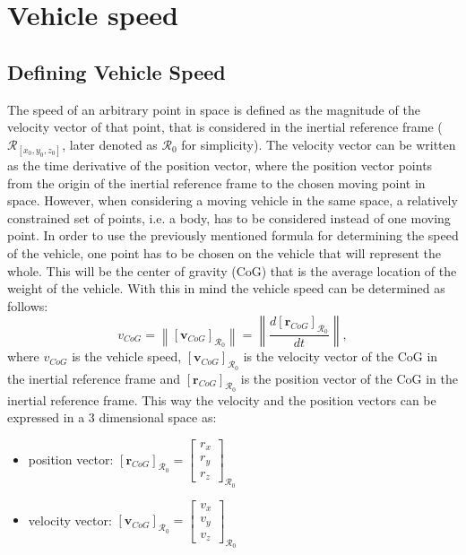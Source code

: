 \chapter{Vehicle speed}

\section{Defining Vehicle Speed}

The speed of an arbitrary point in space is defined as the magnitude of the velocity vector of that point, that is considered in the inertial reference frame ($\mathcal{R}_{[x_0, y_0, z_0]}$, later denoted as $\mathcal{R}_0$ for simplicity). The velocity vector can be written as the time derivative of the position vector, where the position vector points from the origin of the inertial reference frame to the chosen moving point in space. However, when considering a moving vehicle in the same space, a relatively constrained set of points, i.e. a body, has to be considered instead of one moving point. In order to use the previously mentioned formula for determining the speed of the vehicle, one point has to be chosen on the vehicle that will represent the whole. This will be the center of gravity (CoG) that is the average location of the weight of the vehicle. With this in mind the vehicle speed can be determined as follows:
\begin{equation}
    v_{CoG} = \left\| [\textbf{v}_{CoG}]_{\mathcal{R}_0} \right\| = \left\| \frac{d [\textbf{r}_{CoG}]_{\mathcal{R}_0}}{dt} \right\|, 
\end{equation}
where $v_{CoG}$ is the vehicle speed, $[\textbf{v}_{CoG}]_{\mathcal{R}_0}$ is the velocity vector of the CoG in the inertial reference frame and $[\textbf{r}_{CoG}]_{\mathcal{R}_0}$ is the position vector of the CoG in the inertial reference frame. This way the velocity and the position vectors can be expressed in a 3 dimensional space as:
\begin{itemize}
    \item position vector: $[\textbf{r}_{CoG}]_{\mathcal{R}_0} = \begin{bmatrix} r_x \\ r_y \\ r_z \end{bmatrix}_{\mathcal{R}_0}$
    \item velocity vector: $[\textbf{v}_{CoG}]_{\mathcal{R}_0} = \begin{bmatrix} v_x \\ v_y \\ v_z \end{bmatrix}_{\mathcal{R}_0}$
\end{itemize}

